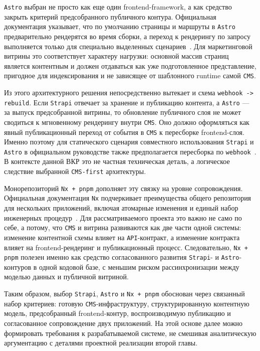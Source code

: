 \texttt{Astro} выбран не просто как еще один frontend-framework, а как средство закрыть
критерий предсобранного публичного контура. Официальная документация указывает, что по
умолчанию страницы и маршруты в \texttt{Astro} предварительно рендерятся во время сборки,
а переход к рендерингу по запросу выполняется только для специально выделенных
сценариев~\cite{astro-on-demand}. Для маркетинговой витрины это соответствует характеру
нагрузки: основной массив страниц является контентным и должен отдаваться как уже
подготовленное представление, пригодное для индексирования и не зависящее от шаблонного
runtime самой \texttt{CMS}.

Из этого архитектурного решения непосредственно вытекает и схема
\texttt{webhook -> rebuild}. Если \texttt{Strapi} отвечает за хранение и публикацию
контента, а \texttt{Astro} --- за выпуск предсобранной витрины, то обновление
публичного слоя не может сводиться к мгновенному рендерингу внутри \texttt{CMS}. Оно
должно оформляться как явный публикационный переход от события в \texttt{CMS} к
пересборке frontend-слоя. Именно поэтому для статического сценария совместного
использования \texttt{Strapi} и \texttt{Astro} в официальном руководстве также
предполагается пересборка по \texttt{webhook}~\cite{astro-strapi-guide}. В контексте
данной ВКР это не частная техническая деталь, а логическое следствие выбранной
\texttt{CMS-first} архитектуры.

Монорепозиторий \texttt{Nx + pnpm} дополняет эту связку на уровне сопровождения.
Официальная документация \texttt{Nx} подчеркивает преимущества общего репозитория для
нескольких приложений, включая атомарные изменения и единый набор инженерных
процедур~\cite{nx-monorepos}. Для рассматриваемого проекта это важно не само по себе, а
потому, что \texttt{CMS} и витрина развиваются как две части одной системы: изменение
контентной схемы влияет на \texttt{API}-контракт, а изменение контракта влияет на
frontend-рендеринг и публикационный процесс. Следовательно, \texttt{Nx + pnpm} полезен
именно как средство согласованного развития \texttt{Strapi}- и \texttt{Astro}-контуров в
одной кодовой базе, с меньшим риском рассинхронизации между моделью данных и публичной
витриной.

Таким образом, выбор \texttt{Strapi}, \texttt{Astro} и \texttt{Nx + pnpm} обоснован через
связанный набор критериев: готовую \texttt{CMS}-инфраструктуру, структурированную
контентную модель, предсобранный frontend-контур, воспроизводимую публикацию и
согласованное сопровождение двух приложений. На этой основе далее можно формировать
требования к разрабатываемой системе, не смешивая аналитическую аргументацию с деталями
проектной реализации второй главы.

